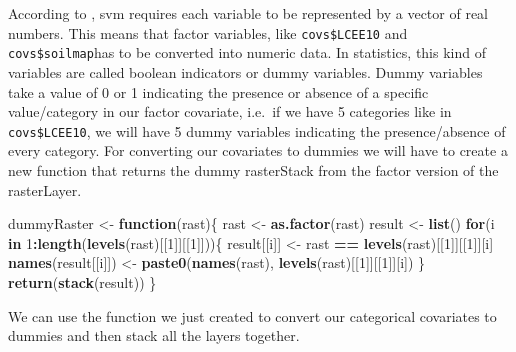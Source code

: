 \documentclass[10pt,b5paper,]{book}
\newenvironment{Shaded}{\begin{snugshade}}{\end{snugshade}}
\newcommand{\CommentTok}[1]{\textcolor[rgb]{0.56,0.35,0.01}{\textit{#1}}}
\newcommand{\ControlFlowTok}[1]{\textcolor[rgb]{0.13,0.29,0.53}{\textbf{#1}}}
\newcommand{\DecValTok}[1]{\textcolor[rgb]{0.00,0.00,0.81}{#1}}
\newcommand{\KeywordTok}[1]{\textcolor[rgb]{0.13,0.29,0.53}{\textbf{#1}}}
\newcommand{\NormalTok}[1]{#1}
\newcommand{\OperatorTok}[1]{\textcolor[rgb]{0.81,0.36,0.00}{\textbf{#1}}}
\newcommand{\StringTok}[1]{\textcolor[rgb]{0.31,0.60,0.02}{#1}}
\theoremstyle{definition}
\theoremstyle{definition}
\theoremstyle{definition}
\theoremstyle{remark}
\begin{document}
According to \citet{hsu2003practical}, svm requires each variable to be
represented by a vector of real numbers. This means that factor
variables, like \texttt{covs\$LCEE10} and \texttt{covs\$soilmap}has to
be converted into numeric data. In statistics, this kind of variables
are called boolean indicators or dummy variables. Dummy variables take a
value of 0 or 1 indicating the presence or absence of a specific
value/category in our factor covariate, i.e.~if we have 5 categories
like in \texttt{covs\$LCEE10}, we will have 5 dummy variables indicating
the presence/absence of every category. For converting our covariates to
dummies we will have to create a new function that returns the dummy
rasterStack from the factor version of the rasterLayer.

\begin{Shaded}
\begin{Highlighting}[]
\NormalTok{dummyRaster <-}\StringTok{ }\ControlFlowTok{function}\NormalTok{(rast)\{}
\NormalTok{  rast <-}\StringTok{ }\KeywordTok{as.factor}\NormalTok{(rast)}
\NormalTok{  result <-}\StringTok{ }\KeywordTok{list}\NormalTok{()}
  \ControlFlowTok{for}\NormalTok{(i }\ControlFlowTok{in} \DecValTok{1}\OperatorTok{:}\KeywordTok{length}\NormalTok{(}\KeywordTok{levels}\NormalTok{(rast)[[}\DecValTok{1}\NormalTok{]][[}\DecValTok{1}\NormalTok{]]))\{}
\NormalTok{    result[[i]] <-}\StringTok{ }\NormalTok{rast }\OperatorTok{==}\StringTok{ }\KeywordTok{levels}\NormalTok{(rast)[[}\DecValTok{1}\NormalTok{]][[}\DecValTok{1}\NormalTok{]][i]}
    \KeywordTok{names}\NormalTok{(result[[i]]) <-}\StringTok{ }\KeywordTok{paste0}\NormalTok{(}\KeywordTok{names}\NormalTok{(rast), }
                                 \KeywordTok{levels}\NormalTok{(rast)[[}\DecValTok{1}\NormalTok{]][[}\DecValTok{1}\NormalTok{]][i])}
\NormalTok{  \}}
  \KeywordTok{return}\NormalTok{(}\KeywordTok{stack}\NormalTok{(result))}
\NormalTok{\}}
\end{Highlighting}
\end{Shaded}

We can use the function we just created to convert our categorical
covariates to dummies and then stack all the layers together.

\begin{Shaded}
\end{Shaded}
\end{document}
